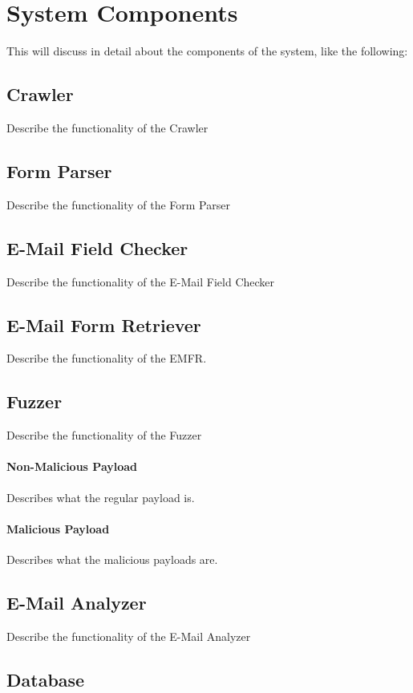 \section{System Components}
\label{Comp}

This will discuss in detail about the components of the system, like the following:

\subsection{Crawler}
	\label{Comp:Crawler}
	Describe the functionality of the Crawler
	
\subsection{Form Parser}
	\label{Comp:FP}
	Describe the functionality of the Form Parser
	
\subsection{E-Mail Field Checker}
	\label{Comp:EMFC}
	Describe the functionality of the E-Mail Field Checker

\subsection{E-Mail Form Retriever}
	\label{Comp:EMFR}
	Describe the functionality of the EMFR.
		
\subsection{Fuzzer}
	\label{Comp:Fuzzer}
	Describe the functionality of the Fuzzer
	\paragraph{Non-Malicious Payload}
		\label{Comp:Fuzzer:nmp}
		Describes what the regular payload is.
		
	\paragraph{Malicious Payload}
		\label{Comp:Fuzzer:mp}
		Describes what the malicious payloads are.
		
\subsection{E-Mail Analyzer}
	\label{Comp:EMA}
	Describe the functionality of the E-Mail Analyzer
	
\subsection{Database}
